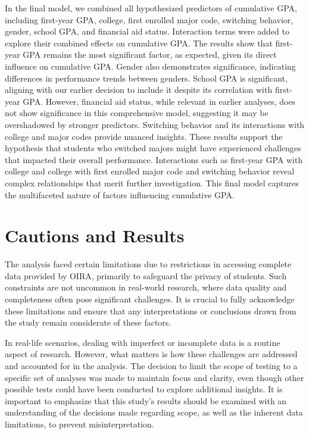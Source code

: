 \documentclass[
  12pt,
]{article}
\begin{document}
In the final model, we combined all hypothesized predictors of
cumulative GPA, including first-year GPA, college, first enrolled major
code, switching behavior, gender, school GPA, and financial aid status.
Interaction terms were added to explore their combined effects on
cumulative GPA. The results show that first-year GPA remains the most
significant factor, as expected, given its direct influence on
cumulative GPA. Gender also demonstrates significance, indicating
differences in performance trends between genders. School GPA is
significant, aligning with our earlier decision to include it despite
its correlation with first-year GPA. However, financial aid status,
while relevant in earlier analyses, does not show significance in this
comprehensive model, suggesting it may be overshadowed by stronger
predictors. Switching behavior and its interactions with college and
major codes provide nuanced insights. These results support the
hypothesis that students who switched majors might have experienced
challenges that impacted their overall performance. Interactions such as
first-year GPA with college and college with first enrolled major code
and switching behavior reveal complex relationships that merit further
investigation. This final model captures the multifaceted nature of
factors influencing cumulative GPA.

\section{Cautions and Results}\label{cautions-and-results}

The analysis faced certain limitations due to restrictions in accessing
complete data provided by OIRA, primarily to safeguard the privacy of
students. Such constraints are not uncommon in real-world research,
where data quality and completeness often pose significant challenges.
It is crucial to fully acknowledge these limitations and ensure that any
interpretations or conclusions drawn from the study remain considerate
of these factors.

In real-life scenarios, dealing with imperfect or incomplete data is a
routine aspect of research. However, what matters is how these
challenges are addressed and accounted for in the analysis. The decision
to limit the scope of testing to a specific set of analyses was made to
maintain focus and clarity, even though other possible tests could have
been conducted to explore additional insights. It is important to
emphasize that this study's results should be examined with an
understanding of the decisions made regarding scope, as well as the
inherent data limitations, to prevent misinterpretation.
\end{document}
